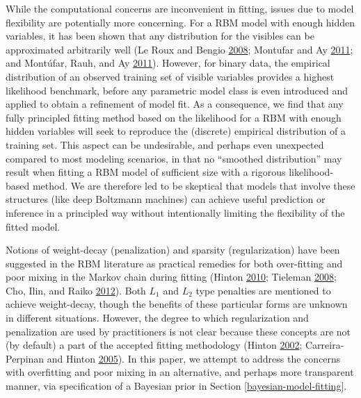 \documentclass[12pt]{article}
\theoremstyle{definition}
\begin{document}
While the computational concerns are inconvenient in fitting, issues due
to model flexibility are potentially more concerning. For a RBM model
with enough hidden variables, it has been shown that any distribution
for the visibles can be approximated arbitrarily well (Le Roux and
Bengio \protect\hyperlink{ref-le2008representational}{2008}; Montufar
and Ay \protect\hyperlink{ref-montufar2011refinements}{2011}; and
Montúfar, Rauh, and Ay
\protect\hyperlink{ref-montufar2011expressive}{2011}). However, for
binary data, the empirical distribution of an observed training set of
visible variables provides a highest likelihood benchmark, before any
parametric model class is even introduced and applied to obtain a
refinement of model fit. As a consequence, we find that any fully
principled fitting method based on the likelihood for a RBM with enough
hidden variables will seek to reproduce the (discrete) empirical
distribution of a training set. This aspect can be undesirable, and
perhaps even unexpected compared to most modeling scenarios, in that no
``smoothed distribution'' may result when fitting a RBM model of
sufficient size with a rigorous likelihood-based method. We are
therefore led to be skeptical that models that involve these structures
(like deep Boltzmann machines) can achieve useful prediction or
inference in a principled way without intentionally limiting the
flexibility of the fitted model.

Notions of weight-decay (penalization) and sparsity (regularization)
have been suggested in the RBM literature as practical remedies for both
over-fitting and poor mixing in the Markov chain during fitting (Hinton
\protect\hyperlink{ref-hinton2010practical}{2010}; Tieleman
\protect\hyperlink{ref-tieleman2008training}{2008}; Cho, Ilin, and Raiko
\protect\hyperlink{ref-cho2012tikhonov}{2012}). Both \(L_1\) and \(L_2\)
type penalties are mentioned to achieve weight-decay, though the
benefits of these particular forms are unknown in different situations.
However, the degree to which regularization and penalization are used by
practitioners is not clear because these concepts are not (by default) a
part of the accepted fitting methodology (Hinton
\protect\hyperlink{ref-hinton2002training}{2002}; Carreira-Perpinan and
Hinton \protect\hyperlink{ref-carreira2005contrastive}{2005}). In this
paper, we attempt to address the concerns with overfitting and poor
mixing in an alternative, and perhaps more transparent manner, via
specification of a Bayesian prior in Section
\ref{bayesian-model-fitting}.
\end{document}
